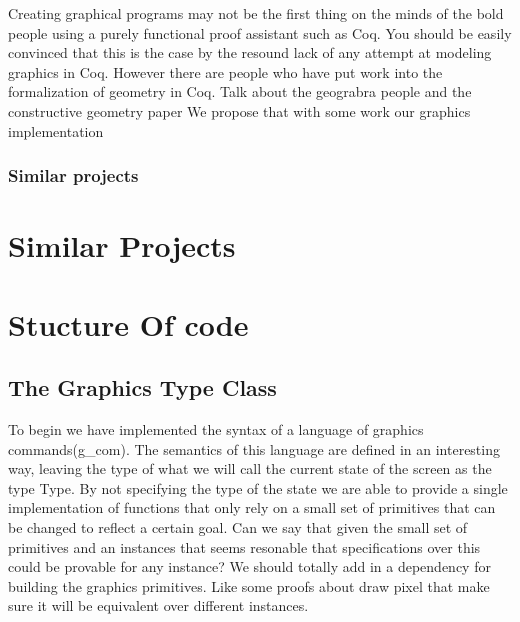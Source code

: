 \documentclass{llncs}
\begin{document}
Creating graphical programs may not be the first thing on the minds of the bold people using a purely functional proof assistant such as Coq.
You should be easily convinced that this is the case by the resound lack of any attempt at modeling graphics in Coq.  However there are people
who have put work into the formalization of geometry in Coq.  {\color{red} Talk about the geograbra people and the constructive geometry paper}
We propose that with some work our graphics implementation 

\subsubsection{Similar projects} 


\section{Similar Projects}


\section{Stucture Of code}

\subsection{The Graphics Type Class}
 To begin we have implemented the syntax of a language of graphics commands(g\_com). The semantics of this language are defined in an interesting way, leaving the type of what we will call the current state of the screen as the type Type.  By not specifying the type of the state we are able to
 provide a single implementation of functions that only rely on a small set of primitives that can be changed to reflect a certain goal.
 {\color{red} Can we say that given the small set of primitives and an instances that seems resonable that specifications over this could be
   provable for any instance? We should totally add in a dependency for building the graphics primitives.  Like some proofs about draw pixel that
  make sure it will be equivalent over different instances. }
\end{document}
